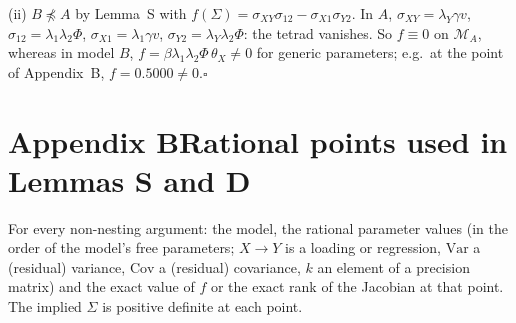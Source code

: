 \documentclass[10pt,a4paper]{article}
\newcommand{\nnest}{\not\preceq}
\begin{document}
\noindent(ii) $B\nnest A$ by Lemma~S with $f(\Sigma)=\sigma_{XY}\sigma_{12} - \sigma_{X1}\sigma_{Y2}$. In $A$, $\sigma_{XY}=\lambda_Y\gamma v$, $\sigma_{12}=\lambda_1\lambda_2\Phi$, $\sigma_{X1}=\lambda_1\gamma v$, $\sigma_{Y2}=\lambda_Y\lambda_2\Phi$: the tetrad vanishes. So $f\equiv0$ on $\mathcal M_A$, whereas in model $B$, $f=\beta\lambda_1\lambda_2\Phi\,\theta_X\neq0$ for generic parameters; e.g.\ at the point of Appendix~B, $f=0.5000\neq0$.\hfill$\square$\par\medskip
{}


\clearpage
\section*{Appendix B\quad Rational points used in Lemmas S and D}
For every non-nesting argument: the model, the rational parameter values (in the order of the model's free parameters; $X\to Y$ is a loading or regression, $\mathrm{Var}$ a (residual) variance, $\mathrm{Cov}$ a (residual) covariance, $k$ an element of a precision matrix) and the exact value of $f$ or the exact rank of the Jacobian at that point. The implied $\Sigma$ is positive definite at each point.
\end{document}
